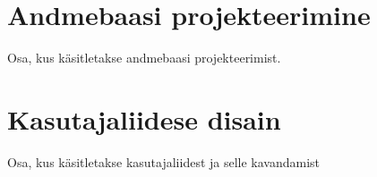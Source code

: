 




\section{Andmebaasi projekteerimine}
Osa, kus käsitletakse andmebaasi projekteerimist.

\section{Kasutajaliidese disain}
Osa, kus käsitletakse kasutajaliidest ja selle kavandamist